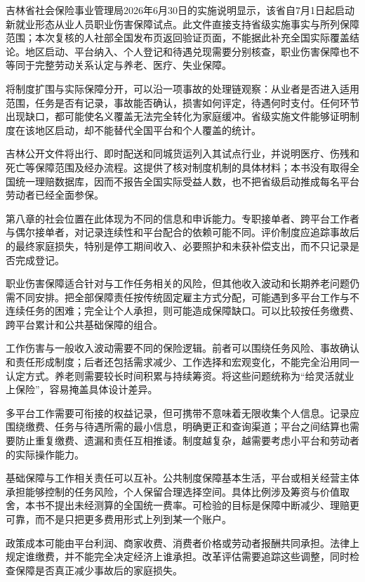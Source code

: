 \documentclass[UTF8,fontset=fandol,zihao=-4,oneside,openany]{ctexbook}
\begin{document}
吉林省社会保险事业管理局2026年6月30日的实施说明显示，该省自7月1日起启动新就业形态从业人员职业伤害保障试点。此文件直接支持省级实施事实与所列保障范围；本次复核的人社部全国发布页返回验证页面，不能据此补充全国实际覆盖结论。地区启动、平台纳入、个人登记和待遇兑现需要分别核查，职业伤害保障也不等同于完整劳动关系认定与养老、医疗、失业保障。\cite{InjuryJilin2026}

\label{arg:P196}
将制度扩围与实际保障分开，可以沿一项事故的处理链观察：从业者是否进入适用范围，任务是否有记录，事故能否确认，损害如何评定，待遇何时支付。任何环节出现缺口，都可能使名义覆盖无法完全转化为家庭缓冲。省级实施文件能够证明制度在该地区启动，却不能替代全国平台和个人覆盖的统计。

吉林公开文件将出行、即时配送和同城货运列入其试点行业，并说明医疗、伤残和死亡等保障范围及经办流程。这提供了核对制度机制的具体材料；本书没有取得全国统一理赔数据库，因而不报告全国实际受益人数，也不把省级启动推成每名平台劳动者已经全面参保。\cite{InjuryJilin2026}

第八章的社会位置在此体现为不同的信息和申诉能力。专职接单者、跨平台工作者与偶尔接单者，对记录连续性和平台配合的依赖可能不同。评价制度应追踪事故后的最终家庭损失，特别是停工期间收入、必要照护和未获补偿支出，而不只记录是否完成登记。

职业伤害保障适合针对与工作任务相关的风险，但其他收入波动和长期养老问题仍需不同安排。把全部保障责任按传统固定雇主方式分配，可能遇到多平台工作与不连续任务的困难；完全让个人承担，则可能造成保障缺口。可以比较按任务缴费、跨平台累计和公共基础保障的组合。

\label{arg:P197}
工作伤害与一般收入波动需要不同的保险逻辑。前者可以围绕任务风险、事故确认和责任形成制度；后者还包括需求减少、工作选择和宏观变化，不能完全沿用同一认定方式。养老则需要较长时间积累与持续筹资。将这些问题统称为“给灵活就业上保险”，容易掩盖具体设计差异。

多平台工作需要可衔接的权益记录，但可携带不意味着无限收集个人信息。记录应围绕缴费、任务与待遇所需的最小信息，明确更正和查询渠道；平台之间结算也需要防止重复缴费、遗漏和责任互相推诿。制度越复杂，越需要考虑小平台和劳动者的实际操作能力。

基础保障与工作相关责任可以互补。公共制度保障基本生活，平台或相关经营主体承担能够控制的任务风险，个人保留合理选择空间。具体比例涉及筹资与价值取舍，本书不提出未经测算的全国统一费率。可检验的目标是保障中断减少、理赔更可靠，而不是只把更多费用形式上列到某一个账户。

政策成本可能由平台利润、商家收费、消费者价格或劳动者报酬共同承担。法律上规定谁缴费，并不能完全决定经济上谁承担。改革评估需要追踪这些调整，同时检查保障是否真正减少事故后的家庭损失。
\end{document}
